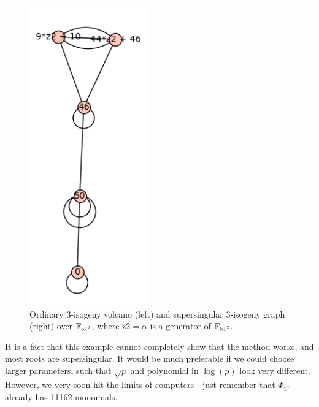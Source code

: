 \begin{example}
\begin{figure}
\begin{minipage}{0.5\textwidth}
        \end{minipage}%
        \begin{minipage}{0.5\textwidth}
            \centering
            \includegraphics[width = 0.45\textwidth]{../example_51_supersingular.png}
        \end{minipage}
        \caption{\label{fig:example_51} Ordinary 3-isogeny volcano (left) and supersingular 3-isogeny graph (right) over $\mathbb{F}_{51^2}$, where $\mathrm{z2} = \alpha$ is a generator of $\mathbb{F}_{51^2}$.}
    \end{figure}
\end{example}
It is a fact that this example cannot completely show that the method works, and most roots are supersingular.
It would be much preferable if we could choose larger parameters, such that $\sqrt{p}$ and polynomial in $\log(p)$ look very different.
However, we very soon hit the limits of computers - just remember that $\Phi_{3^4}$ already has 11162 monomials.

